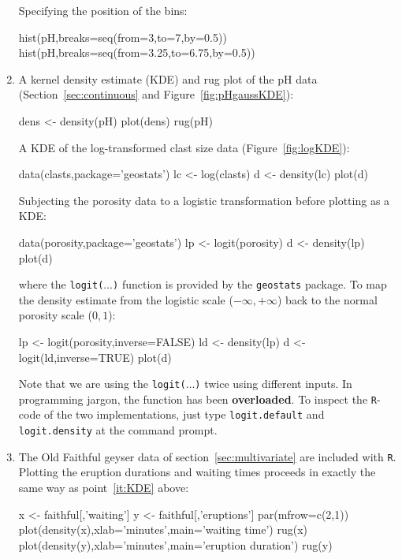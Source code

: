\begin{enumerate}
Specifying the position of the bins:

\begin{script}[firstnumber=3]
hist(pH,breaks=seq(from=3,to=7,by=0.5))
hist(pH,breaks=seq(from=3.25,to=6.75,by=0.5))
\end{script}

\item\label{it:KDE} A kernel density estimate (KDE) and rug plot of
  the pH data (Section~\ref{sec:continuous} and
  Figure~\ref{fig:pHgaussKDE}):

\begin{script}
dens <- density(pH)
plot(dens)
rug(pH)    
\end{script}

A KDE of the log-transformed clast size data
(Figure~\ref{fig:logKDE}):

\begin{script}
data(clasts,package='geostats')
lc <- log(clasts)
d <- density(lc)
plot(d)
\end{script}

Subjecting the porosity data to a logistic transformation before
plotting as a KDE:

\begin{script}
data(porosity,package='geostats')
lp <- logit(porosity)
d <- density(lp)
plot(d)
\end{script}

\noindent where the \texttt{logit($\ldots$)} function is provided by
the \texttt{geostats} package. To map the density estimate from the
logistic scale ($-\infty,+\infty$) back to the normal porosity scale
($0,1$):

\begin{script}[firstnumber=2]
lp <- logit(porosity,inverse=FALSE)
ld <- density(lp)
d <- logit(ld,inverse=TRUE)
plot(d)
\end{script}

Note that we are using the \texttt{logit($\ldots$)} twice using
different inputs. In programming jargon, the function has been
\textbf{overloaded}. To inspect the \texttt{R}-code of the two
implementations, just type \texttt{logit.default} and
\texttt{logit.density} at the command prompt.

\item The Old Faithful geyser data of section~\ref{sec:multivariate}
  are included with \texttt{R}. Plotting the eruption durations and
  waiting times proceeds in exactly the same way as point~\ref{it:KDE}
  above:

\begin{script}
x <- faithful[,'waiting']
y <- faithful[,'eruptions']
par(mfrow=c(2,1))
plot(density(x),xlab='minutes',main='waiting time')
rug(x)
plot(density(y),xlab='minutes',main='eruption duration')
rug(y)
\end{script}


\end{enumerate}
